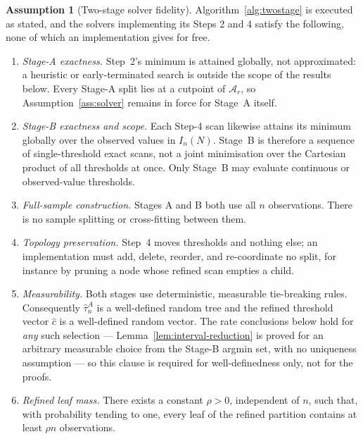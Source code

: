 \documentclass[11pt]{article}
\theoremstyle{plain}
\theoremstyle{definition}
\newtheorem{assumption}{Assumption}
\theoremstyle{remark}
\newcommand{\cA}{\mathcal{A}}
\begin{document}
\begin{assumption}[Two-stage solver fidelity]\label{ass:solver-twostage}
Algorithm~\ref{alg:twostage} is executed as stated, and the solvers
implementing its Steps 2 and 4 satisfy the following, none of which an
implementation gives for free.
\begin{enumerate}[label=(\alph*),nosep]
  \item \emph{Stage-A exactness.} Step~2's minimum is attained globally, not
  approximated: a heuristic or early-terminated search is outside the scope of
  the results below. Every Stage-A split lies at a cutpoint of $\cA_r$, so
  Assumption~\ref{ass:solver} remains in force for Stage~A itself.
  \item \emph{Stage-B exactness and scope.} Each Step-4 scan likewise attains
  its minimum globally over the observed values in $I_n(N)$. Stage~B
  is therefore a sequence of single-threshold exact scans, not a joint
  minimisation over the Cartesian product of all thresholds at once. Only
  Stage~B may evaluate continuous or observed-value thresholds.
  \item \emph{Full-sample construction.} Stages A and B both use all $n$
  observations. There is no sample splitting or cross-fitting between them.
  \item \emph{Topology preservation.} Step~4 moves thresholds and nothing
  else; an implementation must add, delete, reorder, and re-coordinate no
  split, for instance by pruning a node whose refined scan empties a child.
  \item \emph{Measurability.} Both stages use deterministic, measurable
  tie-breaking rules. Consequently $\hat\tau^A_n$ is a well-defined random
  tree and the refined threshold vector $\hat c$ is a
  well-defined random vector. The rate conclusions below hold for
  \emph{any} such selection --- Lemma~\ref{lem:interval-reduction} is proved
  for an arbitrary measurable choice from the Stage-B argmin set, with no
  uniqueness assumption --- so this clause is required for well-definedness
  only, not for the proofs.
  \item \emph{Refined leaf mass.} There exists a constant $\rho>0$, independent
  of $n$, such that, with probability tending to one, every leaf of the refined
  partition contains at least $\rho n$ observations.
\end{enumerate}
\end{assumption}
\end{document}
